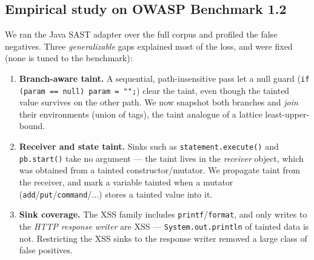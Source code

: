 \documentclass[11pt]{article}
\begin{document}


\subsection{Empirical study on OWASP Benchmark 1.2}
We ran the Java SAST adapter over the full corpus and profiled the false
negatives. Three \emph{generalizable} gaps explained most of the loss, and were
fixed (none is tuned to the benchmark):

\begin{enumerate}[label=(\roman*)]
  \item \textbf{Branch-aware taint.} A sequential, path-insensitive pass let a
        null guard (\texttt{if (param == null) param = "";}) clear the taint,
        even though the tainted value survives on the other path. We now
        snapshot both branches and \emph{join} their environments (union of
        tags), the taint analogue of a lattice least-upper-bound.
  \item \textbf{Receiver and state taint.} Sinks such as
        \texttt{statement.execute()} and \texttt{pb.start()} take no argument
        --- the taint lives in the \emph{receiver} object, which was obtained
        from a tainted constructor/mutator. We propagate taint from the
        receiver, and mark a variable tainted when a mutator
        (\texttt{add}/\texttt{put}/\texttt{command}/...) stores a tainted value
        into it.
  \item \textbf{Sink coverage.} The XSS family includes
        \texttt{printf}/\texttt{format}, and only writes to the
        \emph{HTTP response writer} are XSS --- \texttt{System.out.println} of
        tainted data is not. Restricting the XSS sinks to the response writer
        removed a large class of false positives.
\end{enumerate}
\end{document}
